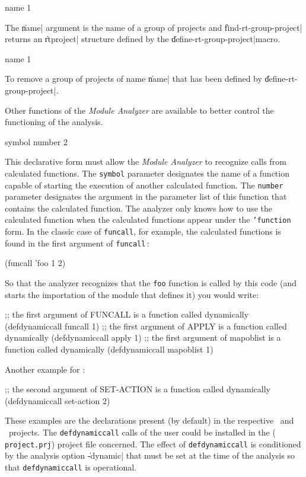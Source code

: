  {name} {1}

The \|name| argument is the name of a group of projects and \|find-rt-group-project| returns an \|rtproject| structure defined by the \|define-rt-group-project|macro.

 {name} {1}

To remove a group of projects of name \|name| that has been defined by \|define-rt-group-project|.


Other functions of the {\em Module Analyzer} are available to better control the functioning of the analysis.

 {symbol number} {2}

This declarative form must allow the {\em Module Analyzer} to recognize calls from calculated functions.  The {\tt symbol} parameter designates the name of a function capable of starting the execution of another calculated function.  
The {\tt number} parameter designates the argument in the parameter list of this function that contains the calculated function.  The analyzer only knows how to use the calculated function when the calculated functions appear under the {\tt 'function} form.  In the classic case of {\tt funcall}, for example, the calculated functions is found in the first argument of {\tt funcall}\,:
\begin{Code*}
(funcall 'foo 1 2) 
\end{Code*}
So that the analyzer recognizes that the {\tt foo} function is called by this code (and starts the importation of the module that defines it) you would write:
\begin{Code*}
;; the first argument of FUNCALL is a function called dynamically
(defdynamiccall funcall 1)
;; the first argument of APPLY is a function called dynamically
(defdynamiccall apply 1)
;; the first argument of mapoblist is a function called dynamically
(defdynamiccall mapoblist 1)
\end{Code*}
Another example for \Aida:
\begin{Code*}
;; the second argument of SET-ACTION is a function called dynamically
(defdynamiccall set-action 2)
\end{Code*}
These examples are the declarations present (by default) in the respective \LeLisp\ and \Aida\  projects.  The {\tt defdynamiccall} calls of the user could be installed in the ({\tt
project.prj}) project file concerned.
The effect of {\tt defdynamiccall} is conditioned by the analysis option \|-dynamic| that must be set at the time of the analysis so that {\tt defdynamiccall} is operational.

